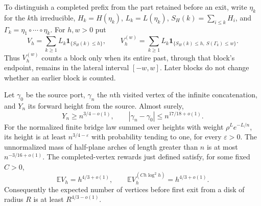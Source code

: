 To distinguish a completed prefix from the part retained before an exit,
write $\eta_k$ for the $k$th irreducible, $H_k=H(\eta_k)$, $L_k=L(\eta_k)$,
$S_H(k)=\sum_{i\le k}H_i$, and $\Gamma_k=\eta_1\circ\cdots\circ\eta_k$.
For $h,w>0$ put
\[
 V_h=\sum_{k\ge1}L_k\mathbf1_{\{S_H(k)\le h\}},\qquad
 V_h^{(w)}=\sum_{k\ge1}L_k
   \mathbf1_{\{S_H(k)\le h,\ S(\Gamma_k)\le w\}}.
\]
Thus $V_h^{(w)}$ counts a block only when its entire past, through that
block's endpoint, remains in the lateral interval $[-w,w]$. Later blocks
do not change whether an earlier block is counted.

\begin{corollary}
\label{R:alt:pv:laws}
Let $\gamma_0$ be the source port, $\gamma_n$ the $n$th visited vertex
of the infinite concatenation, and $Y_n$ its forward height from the source.
Almost surely,
\[
 Y_n\ge n^{3/4-o(1)},\qquad
 |\gamma_n-\gamma_0|\le n^{17/18+o(1)}.
\]
For the normalized finite bridge law summed over heights with weight
$\rho^Le^{-L/n}$, its height is at least $n^{3/4-\varepsilon}$ with
probability tending to one, for every $\varepsilon>0$.
The unnormalized mass of half-plane arches of length greater than $n$
is at most $n^{-3/16+o(1)}$.
The completed-vertex rewards just defined satisfy, for some fixed $C>0$,
\begin{equation}\label{R:alt:pv:prefix}
 \mathbb E V_h=h^{4/3+o(1)},\qquad
 \mathbb E V_h^{(C h\log^2h)}=h^{4/3+o(1)}.
\end{equation}
Consequently the expected number of vertices before first exit from a disk
of radius $R$ is at least $R^{4/3-o(1)}$.
\end{corollary}
